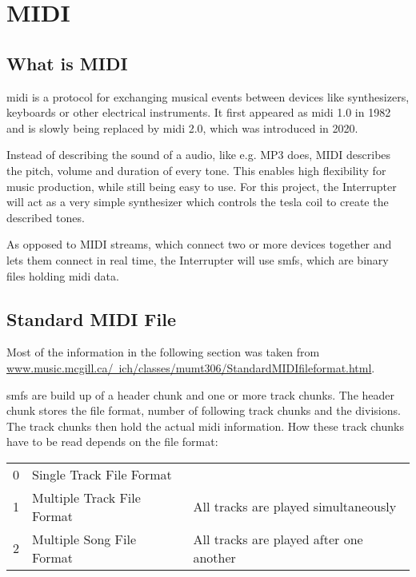 \setchapterpreamble[u]{\margintoc}

\chapter{MIDI}

\section{What is MIDI}

\gls{midi} is a protocol for exchanging musical events between devices like synthesizers, keyboards or other electrical instruments. It first appeared as \gls{midi} 1.0 in 1982 and is slowly being replaced by \gls{midi} 2.0, which was introduced in 2020.

Instead of describing the sound of a audio, like e.g. MP3 does, MIDI describes the pitch, volume and duration of every tone. This enables high flexibility for music production, while still being easy to use. For this project, the Interrupter will act as a very simple synthesizer which controls the tesla coil to create the described tones.

As opposed to MIDI streams, which connect two or more devices together and lets them connect in real time, the Interrupter will use \glspl{smf}, which are binary files holding \gls{midi} data.

\section{Standard MIDI File}

Most of the information in the following section was taken from \href{http://www.music.mcgill.ca/~ich/classes/mumt306/StandardMIDIfileformat.html}{www.music.mcgill.ca/~ich/classes/mumt306/StandardMIDIfileformat.html}.

\glspl{smf} are build up of a header chunk and one or more track chunks. The header chunk stores the file format, number of following track chunks and the divisions. The track chunks then hold the actual \gls{midi} information. How these track chunks have to be read depends on the file format:

\begin{tabular}{cll}
    \midrule
    0 & Single Track File Format   & \\
    1 & Multiple Track File Format & All tracks are played simultaneously\\
    2 & Multiple Song File Format  & All tracks are played after one another\\
    \midrule
\end{tabular}

